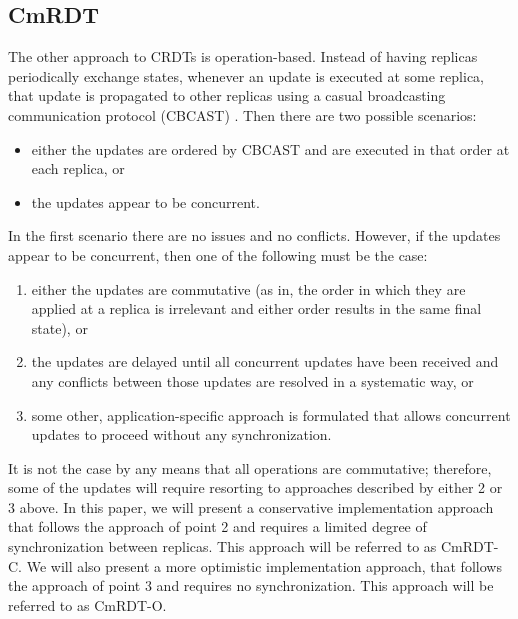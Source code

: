 \documentclass[sigconf,nonacm,11pt]{acmart}
\begin{document}
\subsection{CmRDT}
The other approach to CRDTs is operation-based. Instead of having replicas periodically exchange states, whenever an update is executed at some replica, that update is propagated to other replicas using a casual broadcasting communication protocol (CBCAST) \cite{baldoni2002fundamentals}. Then there are two possible scenarios:
\begin{itemize}
 \item either the updates are ordered by CBCAST and are executed in that order at each replica, or
 \item the updates appear to be concurrent.
\end{itemize}

In the first scenario there are no issues and no conflicts. However, if the updates appear to be concurrent, then one of the following must be the case:
\begin{enumerate}
 \item either the updates are commutative (as in, the order in which they are applied at a replica is irrelevant and either order results in the same final state), or
 \item the updates are delayed until all concurrent updates have been received and any conflicts between those updates are resolved in a systematic way, or
 \item some other, application-specific approach is formulated that allows concurrent updates to proceed without any synchronization.
\end{enumerate}

It is not the case by any means that all operations are commutative; therefore, some of the updates will require resorting to approaches described by either 2 or 3 above. In this paper, we will present a conservative implementation approach that follows the approach of point 2 and requires a limited degree of synchronization between replicas. This approach will be referred to as CmRDT-C. We will also present a more optimistic implementation approach, that follows the approach of point 3 and requires no synchronization. This approach will be referred to as CmRDT-O.
\end{document}
